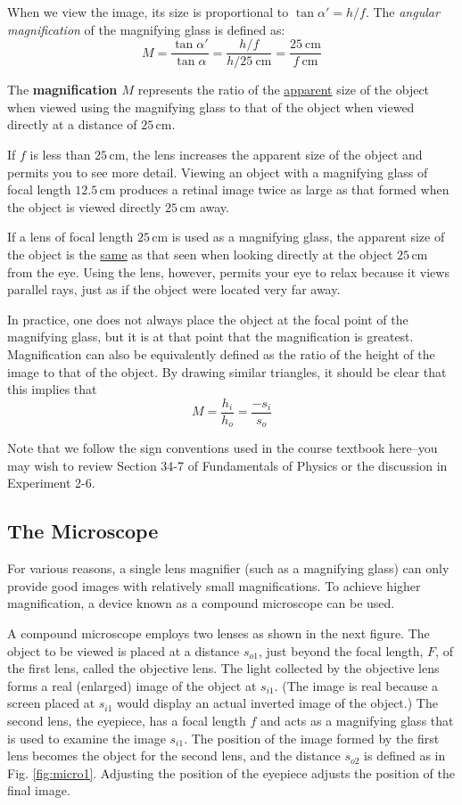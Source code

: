 When we view the image, its size is proportional to $\tan\alpha'=h/f$. The \emph{angular magnification} of the magnifying glass is defined as:
\begin{equation}
  M=\frac{\tan\alpha'}{\tan\alpha}=\frac{h/f}{h/25\ \mathrm{cm}}=\frac{25\ \mathrm{cm}}{f\ \mathrm{cm}}
\end{equation}

The \textbf{magnification $M$} represents the ratio of the \underline{apparent} size of the object when viewed using the magnifying glass to that of the object when viewed directly at a distance of $25\, \textrm{cm}$.\myskip

If $f$ is less than $25\, \textrm{cm}$, the lens increases the apparent size of the object and permits you to see more detail. Viewing an object with a magnifying glass of focal length $12.5\, \textrm{cm}$ produces a retinal image twice as large as that formed when the object is viewed directly $25\, \textrm{cm}$ away.\myskip

If a lens of focal length $25\, \textrm{cm}$ is used as a magnifying glass, the apparent size of the object is the \underline{same} as that seen when looking directly at the object $25\, \textrm{cm}$ from the eye. Using the lens, however, permits your eye to relax because it views parallel rays, just as if the object were located very far away.\myskip

In practice, one does not always place the object at the focal point of the magnifying glass, but it is at that point that the magnification is greatest. Magnification can also be equivalently defined as the ratio of the height of the image to that of the object. By drawing similar triangles, it should be clear that this implies that
$$
M= \frac{h_i}{h_o} = \frac{-s_i}{s_o}
$$

Note that we follow the sign conventions used in the course textbook here--you may wish to review Section 34-7 of Fundamentals of Physics or the discussion in Experiment 2-6.

\subsection{The Microscope}
\label{sec:theorym}
For various reasons, a single lens magnifier (such as a magnifying glass) can only provide good images with relatively small magnifications. To achieve higher magnification, a device known as a compound microscope can be used. \myskip

A compound microscope employs two lenses as shown in the next figure. The object to be viewed is placed at a distance $s_{o1}$, just beyond the focal length, $F$, of the first lens, called the objective lens. The light collected by the objective lens forms a real (enlarged) image of the object at $s_{i1}$. (The image is real because a screen placed at $s_{i1}$ would display an actual inverted image of the object.) The second lens, the eyepiece, has a focal length $f$ and acts as a magnifying glass that is used to examine the image $s_{i1}$. The position of the image formed by the first lens becomes the object for the second lens, and the distance $s_{o2}$ is defined as in Fig. \ref{fig:micro1}. Adjusting the position of the eyepiece adjusts the position of the final image. \myskip

